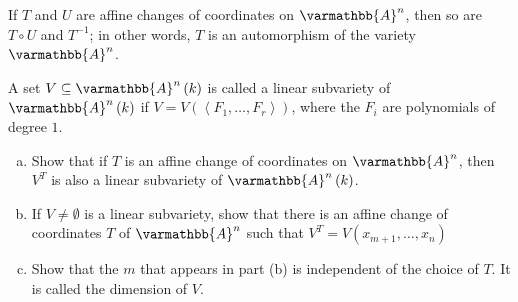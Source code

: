 \documentclass[10pt]{mypackage}
\renewcommand*{\mathbb}[1]{\varmathbb{#1}}
\newcommand{\A}{\mathbb{A}}
\begin{document}
If $T$ and $U$ are affine changes of coordinates on $\A^n$, then so are $T\circ U$ and $T^{-1}$; in other words, $T$ is an automorphism of the variety $\A^n$.
\begin{exercise}[Exercise 2.14]
A set $V\subseteq \A^n\left( k \right)$ is called a linear subvariety of $\A^n\left( k \right)$ if $V = V\left( \left\langle F_1,\dots,F_r \right\rangle \right)$, where the $F_i$ are polynomials of degree $1$.
\begin{enumerate}[(a)]
  \item Show that if $T$ is an affine change of coordinates on $\A^n$, then $V^T$ is also a linear subvariety of $\A^n\left( k \right)$.
  \item If $V\neq\emptyset$ is a linear subvariety, show that there is an affine change of coordinates $T$ of $\A^n$ such that $V^{T} = V\left( x_{m+1},\dots,x_n \right)$
  \item Show that the $m$ that appears in part (b) is independent of the choice of $T$. It is called the dimension of $V$.
\end{enumerate}
\end{exercise}
\end{document}
